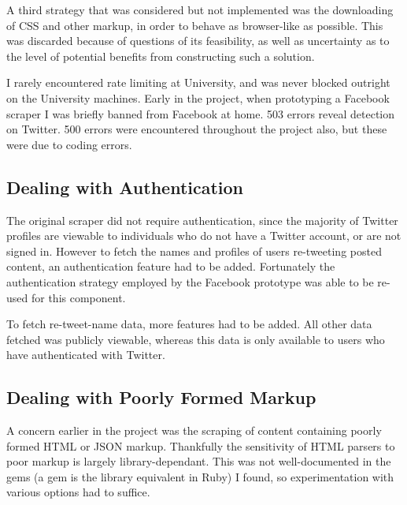 A third strategy that was considered but not implemented was the downloading of CSS and other markup, in order to behave as browser-like as possible. This was discarded because of questions of its feasibility, as well as uncertainty as to the level of potential benefits from constructing such a solution. 

I rarely encountered rate limiting at University, and was never blocked outright on the University machines. Early in the project, when prototyping a Facebook scraper I was briefly banned from Facebook at home. 503 errors reveal detection on Twitter. 500 errors were encountered throughout the project also, but these were due to coding errors. 

\subsection{Dealing with Authentication}

The original scraper did not require authentication, since the majority of Twitter profiles are viewable to individuals who do not have a Twitter account, or are not signed in. However to fetch the names and profiles of users re-tweeting posted content, an authentication feature had to be added. Fortunately the authentication strategy employed by the Facebook prototype was able to be re-used for this component. 

To fetch re-tweet-name data, more features had to be added. All other data fetched was publicly viewable, whereas this data is only available to users who have authenticated with Twitter.

\subsection{Dealing with Poorly Formed Markup}

A concern earlier in the project was the scraping of content containing poorly formed HTML or JSON markup. Thankfully the sensitivity of HTML parsers to poor markup is largely library-dependant. This was not well-documented in the gems (a gem is the library equivalent in Ruby) I found, so experimentation with various options had to suffice. 





